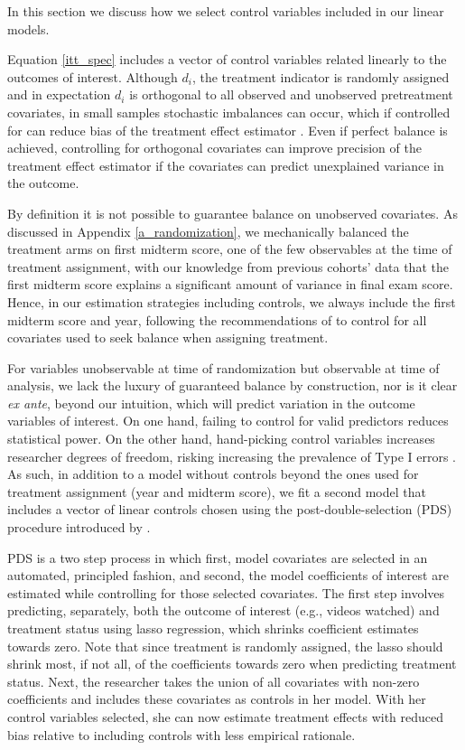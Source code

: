 \documentclass[12pt]{article}
\begin{document}
In this section we discuss how we select control variables included in our linear models.

Equation \ref{itt_spec} includes a vector of control variables related linearly to the outcomes of interest. Although $d_i$, the treatment indicator is randomly assigned and in expectation $d_i$ is orthogonal to all observed and unobserved pretreatment covariates, in small samples stochastic imbalances can occur, which if controlled for can reduce bias of the treatment effect estimator \parencite{ai2017}. Even if perfect balance is achieved, controlling for orthogonal covariates can improve precision of the treatment effect estimator if the covariates can predict unexplained variance in the outcome.

By definition it is not possible to guarantee balance on unobserved covariates. As discussed in Appendix \ref{a_randomization}, we mechanically balanced the treatment arms on first midterm score, one of the few observables at the time of treatment assignment, with our knowledge from previous cohorts' data that the first midterm score explains a significant amount of variance in final exam score. Hence, in our estimation strategies including controls, we always include the first midterm score and year, following the recommendations of \textcite{bm2009} to control for all covariates used to seek balance when assigning treatment.

For variables unobservable at time of randomization but observable at time of analysis, we lack the luxury of guaranteed balance by construction, nor is it clear \textit{ex ante}, beyond our intuition, which will predict variation in the outcome variables of interest. On one hand, failing to control for valid predictors reduces statistical power. On the other hand, hand-picking control variables increases researcher degrees of freedom, risking increasing the prevalence of Type I errors \parencite{sns2011}. As such, in addition to a model without controls beyond the ones used for treatment assignment (year and midterm score), we fit a second model that includes a vector of linear controls chosen using the post-double-selection (PDS) procedure introduced by \textcite{bch2014a}.

PDS is a two step process in which first, model covariates are selected in an automated, principled fashion, and second, the model coefficients of interest are estimated while controlling for those selected covariates. The first step involves predicting, separately, both the outcome of interest (e.g., videos watched) and treatment status using lasso regression, which shrinks coefficient estimates towards zero. Note that since treatment is randomly assigned, the lasso should shrink most, if not all, of the coefficients towards zero when predicting treatment status. Next, the researcher takes the union of all covariates with non-zero coefficients and includes these covariates as controls in her model. With her control variables selected, she can now estimate treatment effects with reduced bias relative to including controls with less empirical rationale.
\end{document}
